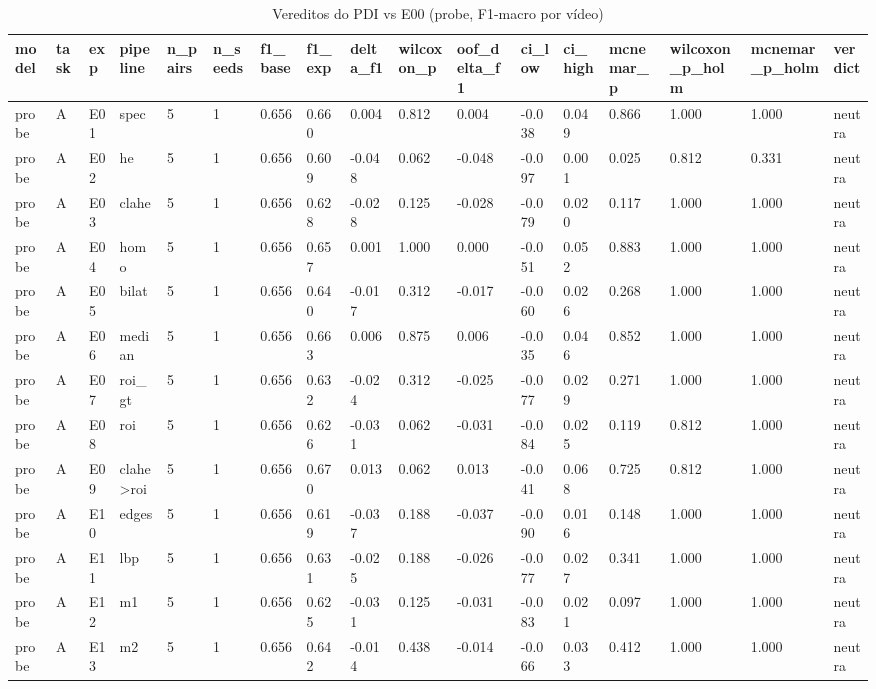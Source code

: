 \begin{table}[ht]
\centering
\caption{Vereditos do PDI vs E00 (probe, F1-macro por vídeo)}
\begin{tabular}{lllllllllllllllll}
\toprule
model & task & exp & pipeline & n\_pairs & n\_seeds & f1\_base & f1\_exp & delta\_f1 & wilcoxon\_p & oof\_delta\_f1 & ci\_low & ci\_high & mcnemar\_p & wilcoxon\_p\_holm & mcnemar\_p\_holm & verdict \\
\midrule
probe & A & E01 & spec & 5 & 1 & 0.656 & 0.660 & 0.004 & 0.812 & 0.004 & -0.038 & 0.049 & 0.866 & 1.000 & 1.000 & neutra \\
probe & A & E02 & he & 5 & 1 & 0.656 & 0.609 & -0.048 & 0.062 & -0.048 & -0.097 & 0.001 & 0.025 & 0.812 & 0.331 & neutra \\
probe & A & E03 & clahe & 5 & 1 & 0.656 & 0.628 & -0.028 & 0.125 & -0.028 & -0.079 & 0.020 & 0.117 & 1.000 & 1.000 & neutra \\
probe & A & E04 & homo & 5 & 1 & 0.656 & 0.657 & 0.001 & 1.000 & 0.000 & -0.051 & 0.052 & 0.883 & 1.000 & 1.000 & neutra \\
probe & A & E05 & bilat & 5 & 1 & 0.656 & 0.640 & -0.017 & 0.312 & -0.017 & -0.060 & 0.026 & 0.268 & 1.000 & 1.000 & neutra \\
probe & A & E06 & median & 5 & 1 & 0.656 & 0.663 & 0.006 & 0.875 & 0.006 & -0.035 & 0.046 & 0.852 & 1.000 & 1.000 & neutra \\
probe & A & E07 & roi\_gt & 5 & 1 & 0.656 & 0.632 & -0.024 & 0.312 & -0.025 & -0.077 & 0.029 & 0.271 & 1.000 & 1.000 & neutra \\
probe & A & E08 & roi & 5 & 1 & 0.656 & 0.626 & -0.031 & 0.062 & -0.031 & -0.084 & 0.025 & 0.119 & 0.812 & 1.000 & neutra \\
probe & A & E09 & clahe>roi & 5 & 1 & 0.656 & 0.670 & 0.013 & 0.062 & 0.013 & -0.041 & 0.068 & 0.725 & 0.812 & 1.000 & neutra \\
probe & A & E10 & edges & 5 & 1 & 0.656 & 0.619 & -0.037 & 0.188 & -0.037 & -0.090 & 0.016 & 0.148 & 1.000 & 1.000 & neutra \\
probe & A & E11 & lbp & 5 & 1 & 0.656 & 0.631 & -0.025 & 0.188 & -0.026 & -0.077 & 0.027 & 0.341 & 1.000 & 1.000 & neutra \\
probe & A & E12 & m1 & 5 & 1 & 0.656 & 0.625 & -0.031 & 0.125 & -0.031 & -0.083 & 0.021 & 0.097 & 1.000 & 1.000 & neutra \\
probe & A & E13 & m2 & 5 & 1 & 0.656 & 0.642 & -0.014 & 0.438 & -0.014 & -0.066 & 0.033 & 0.412 & 1.000 & 1.000 & neutra \\

\end{tabular}
\end{table}
